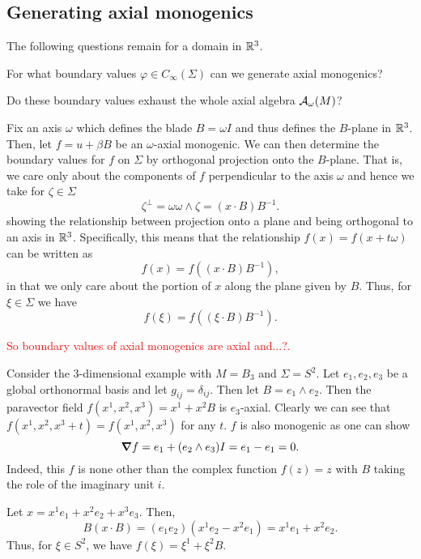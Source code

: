 \documentclass[12pt]{article}
\begin{document}
\subsection{Generating axial monogenics}

The following questions remain for a domain in $\mathbb{R}^3$.

\begin{question}
    For what boundary values $\varphi \in C_\infty(\Sigma)$ can we generate axial monogenics?
\end{question}

\begin{question}
    Do these boundary values exhaust the whole axial algebra $\mathcal{A}_{\omega}(M)$?
\end{question}

Fix an axis $\omega$ which defines the blade $B = \omega I$ and thus defines the $B$-plane in $\mathbb{R}^3$.  Then, let $f=u+\beta B$ be an $\omega$-axial monogenic.  We can then determine the boundary values for $f$ on $\Sigma$ by orthogonal projection onto the $B$-plane.  That is, we care only about the components of $f$ perpendicular to the axis $\omega$ and hence we take for $\zeta \in \Sigma$
\[
\zeta^\perp = \omega \omega \wedge \zeta = (x\cdot B)B^{-1}.
\]
showing the relationship between projection onto a plane and being orthogonal to an axis in $\mathbb{R}^3$. Specifically, this means that the relationship $f(x)=f(x+t\omega)$ can be written as
\[
f(x)=f((x\cdot B)B^{-1}),
\]
in that we only care about the portion of $x$ along the plane given by $B$.  Thus, for $\xi \in \Sigma$ we have
\[
f(\xi) = f((\xi \cdot B)B^{-1}).
\]

\textcolor{red}{So boundary values of axial monogenics are axial and...?.}

\begin{example}
    Consider the 3-dimensional example with $M=B_3$ and $\Sigma=S^2$.  Let $e_1,e_2,e_3$ be a global orthonormal basis and let $g_{ij}=\delta_{ij}$.  Then let $B=e_1 \wedge e_2$.  Then the paravector field $f(x^1,x^2,x^3)=x^1+x^2B$ is $e_3$-axial. Clearly we can see that $f(x^1,x^2,x^3+t)=f(x^1,x^2,x^3)$ for any $t$.  $f$ is also monogenic as one can show
    \[
        \boldsymbol{\nabla} f = e_1 + (e_2 \wedge e_3)I = e_1 - e_1 = 0.
    \]
    Indeed, this $f$ is none other than the complex function $f(z)=z$ with $B$ taking the role of the imaginary unit $i$. 

    Let $x=x^1e_1 + x^2e_2 + x^3e_3$.  Then, 
    \[
        B (x\cdot B) = (e_1e_2)( x^1e_2 -x^2 e_1 ) = x^1 e_1 + x^2 e_2.
    \] 
    Thus, for $\xi \in S^2$, we have $f(\xi)=\xi^1 +\xi^2 B$.
\end{example}
\end{document}
